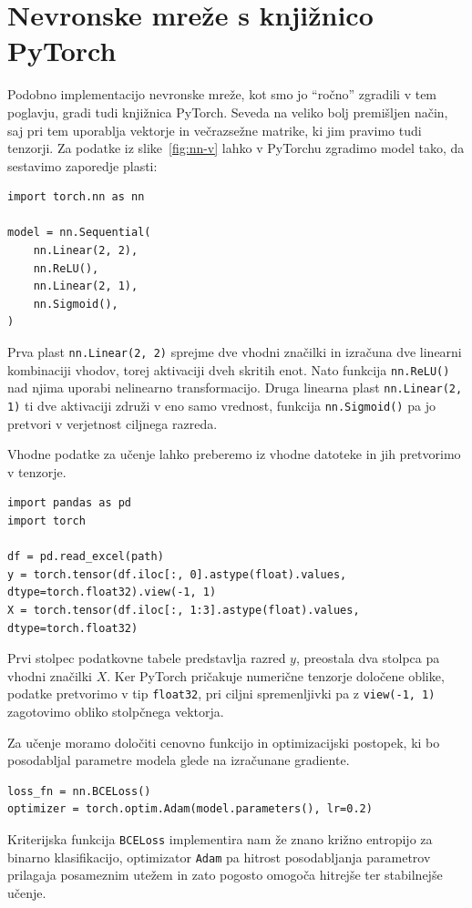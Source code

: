 \section{Nevronske mreže s knjižnico PyTorch}

Podobno implementacijo nevronske mreže, kot smo jo ``ročno'' zgradili v tem poglavju, gradi tudi knjižnica PyTorch. Seveda na veliko bolj premišljen način, saj pri tem uporablja vektorje in večrazsežne matrike, ki jim pravimo tudi tenzorji. Za podatke iz slike~\ref{fig:nn-v} lahko v PyTorchu zgradimo model tako, da sestavimo zaporedje plasti:
%
\vspace*{3mm}
\begin{lstlisting}
import torch.nn as nn

model = nn.Sequential(
    nn.Linear(2, 2),
    nn.ReLU(),
    nn.Linear(2, 1),
    nn.Sigmoid(),
)
\end{lstlisting}
%
Prva plast \texttt{nn.Linear(2, 2)} sprejme dve vhodni značilki in izračuna dve linearni kombinaciji vhodov, torej aktivaciji dveh skritih enot. Nato funkcija \texttt{nn.ReLU()} nad njima uporabi nelinearno transformacijo. Druga linearna plast \texttt{nn.Linear(2, 1)} ti dve aktivaciji združi v eno samo vrednost, funkcija \texttt{nn.Sigmoid()} pa jo pretvori v verjetnost ciljnega razreda.

Vhodne podatke za učenje lahko preberemo iz vhodne datoteke in jih pretvorimo v tenzorje.
%
\vspace*{3mm}
\begin{lstlisting}
import pandas as pd
import torch

df = pd.read_excel(path)
y = torch.tensor(df.iloc[:, 0].astype(float).values, dtype=torch.float32).view(-1, 1)
X = torch.tensor(df.iloc[:, 1:3].astype(float).values, dtype=torch.float32)
\end{lstlisting}
%
Prvi stolpec podatkovne tabele predstavlja razred \(y\), preostala dva stolpca pa vhodni značilki \(X\). Ker PyTorch pričakuje numerične tenzorje določene oblike, podatke pretvorimo v tip \texttt{float32}, pri ciljni spremenljivki pa z \texttt{view(-1, 1)} zagotovimo obliko stolpčnega vektorja.

Za učenje moramo določiti cenovno funkcijo in optimizacijski postopek, ki bo posodabljal parametre modela glede na izračunane gradiente. 
%
\vspace*{3mm}
\begin{lstlisting}
loss_fn = nn.BCELoss()
optimizer = torch.optim.Adam(model.parameters(), lr=0.2)
\end{lstlisting}
%
Kriterijska funkcija \texttt{BCELoss} 
%
%
implementira nam že znano križno entropijo za binarno klasifikacijo, optimizator \texttt{Adam} pa hitrost posodabljanja parametrov prilagaja posameznim utežem in zato pogosto omogoča hitrejše ter stabilnejše učenje.


